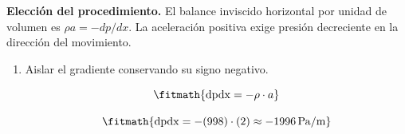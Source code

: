 \noindent\textbf{Elección del procedimiento.} El balance inviscido horizontal por unidad de volumen es $\rho a=-dp/dx$. La aceleración positiva exige presión decreciente en la dirección del movimiento.

\begin{enumerate}

\item Aislar el gradiente conservando su signo negativo.

\[\fitmath{\mathrm{dpdx}=-\rho\cdot a}\]

\[\fitmath{\mathrm{dpdx}=-(998)\cdot (2)\approx -1996\,\mathrm{Pa/m}}\]

\end{enumerate}
